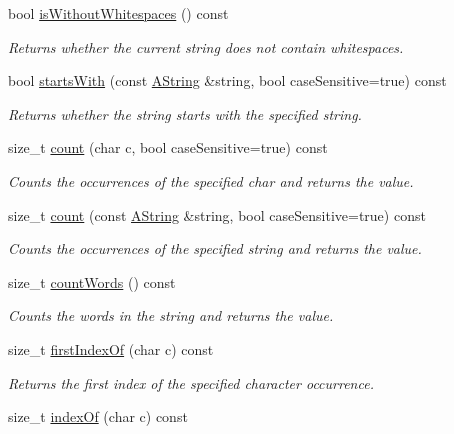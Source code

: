 \begin{DoxyCompactItemize}
bool \mbox{\hyperlink{class_a_string_a166108dfe6ceecf9267441715c3a7bce}{is\+Without\+Whitespaces}} () const
\begin{DoxyCompactList}\small\item\em Returns whether the current string does not contain whitespaces. \end{DoxyCompactList}\item 
bool \mbox{\hyperlink{class_a_string_aef584231c6ddc8925fbfa92ccf22cf53}{starts\+With}} (const \mbox{\hyperlink{class_a_string}{A\+String}} \&string, bool case\+Sensitive=true) const
\begin{DoxyCompactList}\small\item\em Returns whether the string starts with the specified string. \end{DoxyCompactList}\item 
size\+\_\+t \mbox{\hyperlink{class_a_string_aec69f5126101c65f03723a7969d5cccd}{count}} (char c, bool case\+Sensitive=true) const
\begin{DoxyCompactList}\small\item\em Counts the occurrences of the specified char and returns the value. \end{DoxyCompactList}\item 
size\+\_\+t \mbox{\hyperlink{class_a_string_a24d7963315d80af76af246970f8c19dd}{count}} (const \mbox{\hyperlink{class_a_string}{A\+String}} \&string, bool case\+Sensitive=true) const
\begin{DoxyCompactList}\small\item\em Counts the occurrences of the specified string and returns the value. \end{DoxyCompactList}\item 
size\+\_\+t \mbox{\hyperlink{class_a_string_aed6d37a9b7bfd2dee2d50c37401a1dad}{count\+Words}} () const
\begin{DoxyCompactList}\small\item\em Counts the words in the string and returns the value. \end{DoxyCompactList}\item 
size\+\_\+t \mbox{\hyperlink{class_a_string_a8b92a3ca206d9a1a091c8e0609d39c0b}{first\+Index\+Of}} (char c) const
\begin{DoxyCompactList}\small\item\em Returns the first index of the specified character occurrence. \end{DoxyCompactList}\item 
size\+\_\+t \mbox{\hyperlink{class_a_string_a28ba997ce8f0acc4d05cc567bdfce6d0}{index\+Of}} (char c) const

\end{DoxyCompactItemize}
